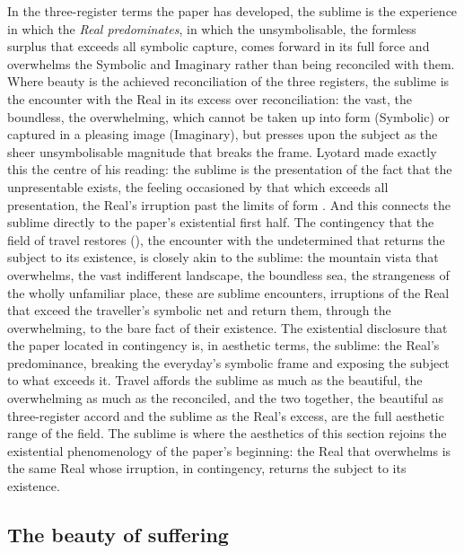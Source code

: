 In the three-register terms the paper has developed, the sublime is the experience in which the \emph{Real predominates}, in which the unsymbolisable, the formless surplus that exceeds all symbolic capture, comes forward in its full force and overwhelms the Symbolic and Imaginary rather than being reconciled with them. Where beauty is the achieved reconciliation of the three registers, the sublime is the encounter with the Real in its excess over reconciliation: the vast, the boundless, the overwhelming, which cannot be taken up into form (Symbolic) or captured in a pleasing image (Imaginary), but presses upon the subject as the sheer unsymbolisable magnitude that breaks the frame. Lyotard made exactly this the centre of his reading: the sublime is the presentation of the fact that the unpresentable exists, the feeling occasioned by that which exceeds all presentation, the Real's irruption past the limits of form \parencite{lyotard1994}. And this connects the sublime directly to the paper's existential first half. The contingency that the field of travel restores (), the encounter with the undetermined that returns the subject to its existence, is closely akin to the sublime: the mountain vista that overwhelms, the vast indifferent landscape, the boundless sea, the strangeness of the wholly unfamiliar place, these are sublime encounters, irruptions of the Real that exceed the traveller's symbolic net and return them, through the overwhelming, to the bare fact of their existence. The existential disclosure that the paper located in contingency is, in aesthetic terms, the sublime: the Real's predominance, breaking the everyday's symbolic frame and exposing the subject to what exceeds it. Travel affords the sublime as much as the beautiful, the overwhelming as much as the reconciled, and the two together, the beautiful as three-register accord and the sublime as the Real's excess, are the full aesthetic range of the field. The sublime is where the aesthetics of this section rejoins the existential phenomenology of the paper's beginning: the Real that overwhelms is the same Real whose irruption, in contingency, returns the subject to its existence.

\subsection{The beauty of suffering}
\label{p21:sub:ap-suffering}

